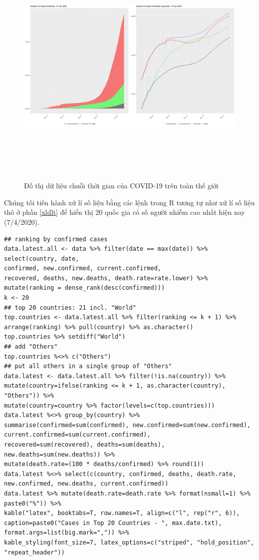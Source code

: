 \documentclass[12pt, a4paper,oneside]{book}
\theoremstyle{definition}
\begin{document}
\begin{figure}[t]
	\centering
	\includegraphics[width=1\linewidth,height=12cm]{anh/Rplot01}  
	\vskip-4mm
	\caption{Đồ thị dữ liệu chuỗi thời gian của COVID-19 trên toàn thế giới}
	\label{h22}
\end{figure}
Chúng tôi tiến hành xử lí số liệu bằng các lệnh trong R tương tự như xử lí số liệu thô ở phần \ref{xldlt} để hiển thị 20 quốc gia có số người nhiễm cao nhất hiện nay (7/4/2020).
\begin{lstlisting}
## ranking by confirmed cases
data.latest.all <- data %>% filter(date == max(date)) %>%
select(country, date,
confirmed, new.confirmed, current.confirmed,
recovered, deaths, new.deaths, death.rate=rate.lower) %>%
mutate(ranking = dense_rank(desc(confirmed)))
k <- 20
## top 20 countries: 21 incl. "World"
top.countries <- data.latest.all %>% filter(ranking <= k + 1) %>%
arrange(ranking) %>% pull(country) %>% as.character()
top.countries %>% setdiff("World")
## add "Others"
top.countries %<>% c("Others")
## put all others in a single group of "Others"
data.latest <- data.latest.all %>% filter(!is.na(country)) %>%
mutate(country=ifelse(ranking <= k + 1, as.character(country), "Others")) %>%
mutate(country=country %>% factor(levels=c(top.countries)))
data.latest %<>% group_by(country) %>%
summarise(confirmed=sum(confirmed), new.confirmed=sum(new.confirmed),
current.confirmed=sum(current.confirmed),
recovered=sum(recovered), deaths=sum(deaths), new.deaths=sum(new.deaths)) %>%
mutate(death.rate=(100 * deaths/confirmed) %>% round(1))
data.latest %<>% select(c(country, confirmed, deaths, death.rate,
new.confirmed, new.deaths, current.confirmed))
data.latest %>% mutate(death.rate=death.rate %>% format(nsmall=1) %>% paste0("%")) %>%
kable("latex", booktabs=T, row.names=T, align=c("l", rep("r", 6)),
caption=paste0("Cases in Top 20 Countries - ", max.date.txt),
format.args=list(big.mark=",")) %>%
kable_styling(font_size=7, latex_options=c("striped", "hold_position", "repeat_header"))
\end{lstlisting}
\end{document}
